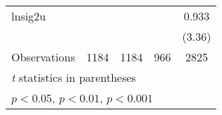 {\begin{tabular}{l*{4}{c}}
lnsig2u             &                     &                     &                     &       0.933\sym{***}\\
                    &                     &                     &                     &      (3.36)         \\
\hline
Observations        &        1184         &        1184         &         966         &        2825         \\
\hline\hline
\multicolumn{5}{l}{\footnotesize \textit{t} statistics in parentheses}\\
\multicolumn{5}{l}{\footnotesize \sym{*} \(p<0.05\), \sym{**} \(p<0.01\), \sym{***} \(p<0.001\)}\\
\end{tabular}
}

